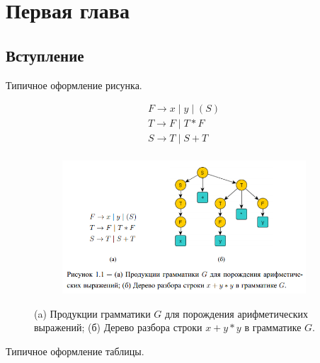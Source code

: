 ﻿\chapter{Первая глава}

\section{Вступление}

Типичное оформление рисунка.

\begin{figure}[ht]
    \centering
        \begin{subfigure}[b]{0.3\textwidth}    
        \centering
            $$\begin{array}{l}
            F \to x \;|\; y \;|\; (S) \\
            T \to F \;|\; T \ast F \\
            S \to T \;|\; S + T \\    
            \end{array}$$
            \caption{}
        \end{subfigure} %
        \begin{subfigure}[b]{0.6\textwidth}
        \centering
            \includegraphics[scale=0.7]{parseTree.png}
            \caption{}
        \end{subfigure}
     
        \caption{(a) Продукции грамматики $G$ для порождения арифметических выражений; 
                 (б) Дерево разбора строки $x+y\ast y$ в грамматике $G$.}
        \label{fig_parsetree}
\end{figure}

\clearpage
Типичное оформление таблицы.

